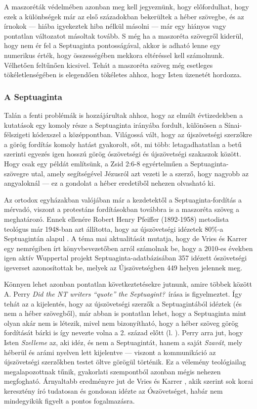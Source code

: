 \documentclass{article}
\newcommand\hu{\selectlanguage{magyar}\frenchspacing}
\begin{document}
A maszoréták védelmében azonban meg kell jegyeznünk, hogy előfordulhat,
hogy ezek a különbségek már az első századokban bekerültek a héber szövegbe, és
az írnokok --- hiába igyekeztek hiba nélkül másolni --- már egy hiányos vagy pontatlan
változatot másoltak tovább. S még ha a maszoréta szövegről kiderül, hogy nem ér fel
a Septuaginta pontosságával, akkor is adható lenne egy numerikus érték, hogy összességében mekkora
eltéréssel kell számolnunk. Vélhetően feltűnően kicsivel. Tehát a maszoréta szöveg
még esetleges tökéletlenségében is elegendően tökéletes ahhoz, hogy Isten üzenetét hordozza.

\subsubsection{A Septuaginta}

Talán a fenti problémák is hozzájárultak ahhoz, hogy
az elmúlt évtizedekben a kutatások egy komoly része a Septuaginta irányába fordult,
különösen a Sínai-félszigeti kódexszel a középpontban. Világossá vált, hogy
az újszövetségi szerzőkre a görög fordítás komoly hatást gyakorolt, sőt, mi több:
letagadhatatlan a betű szerinti egyezés igen hosszú görög ószövetségi és
újszövetségi szakaszok között. Hogy csak egy példát említsünk, a Zsid 2:6-8
egyértelműen a Septuaginta-szövegre utal, amely segítségével Jézusról azt vezeti le
a szerző, hogy nagyobb az angyaloknál --- ez a gondolat a héber eredetiből nehezen olvasható ki.

Az ortodox egyházakban valójában már a kezdetektől a Septuaginta-fordítás a mérvadó,
viszont a protestáns fordításokban továbbra is a maszoréta szöveg a meghatározó.
Ennek ellenére Robert Henry Pfeiffer (1892-1958) metodista teológus már 1948-ban azt állította, hogy
az újszövetségi idézetek 80\%-a Septuagintán alapul \cite{Pfeiffer}. A téma mai aktualitását
mutatja, hogy
de Vries és Karrer egy nemrégiben írt könyvbevezetőben \cite[3. o.]{deVriesKarrer} arról számolnak be,
hogy a 2010-es években igen aktív Wuppertal projekt Septuaginta-adatbázisában 357 idézett ószövetségi igeverset
azonosítottak be,
melyek az Újszövetségben 449 helyen jelennek meg.

Könnyen lehet azonban pontatlan következtetésekre
jutnunk, amire többek között A. Perry \textit{Did the NT writers ``quote''
the Septuagint?}\hu\ írása \cite{Perry} is figyelmeztet. Így tehát az a kijelentés, hogy
az újszövetségi szerzők a Septuagintából idéztek (és nem a héber szövegből), már
abban is pontatlan lehet, hogy a Septuaginta mint olyan akár nem is létezik, mivel nem bizonyítható,
hogy a héber szöveg görög fordítását bárki is így nevezte volna a 2. század előtt (l.
\cite[32., 89. o.]{JobesSilva}). Perry arra jut, hogy Isten \textit{Szelleme} az, aki idéz, és nem a Septuagintát,
hanem a saját \textit{Szavát}, mely héberül és arámi nyelven lett kijelentve --- viszont a kommunikáció az újszövetségi szerzőkben
testet öltve görögül történik. Ez a vélemény teológiailag megalapozottnak tűnik,
gyakorlati szempontból azonban mégis nehezen megfogható. Árnyaltabb eredményre jut de Vries és Karrer \cite[16. o.]{deVriesKarrer},
akik szerint sok korai keresztény író tudatosan és gondosan idézte az Ószövetséget, habár nem mindegyikük
figyelt a pontos fogalmazásra.
\end{document}
